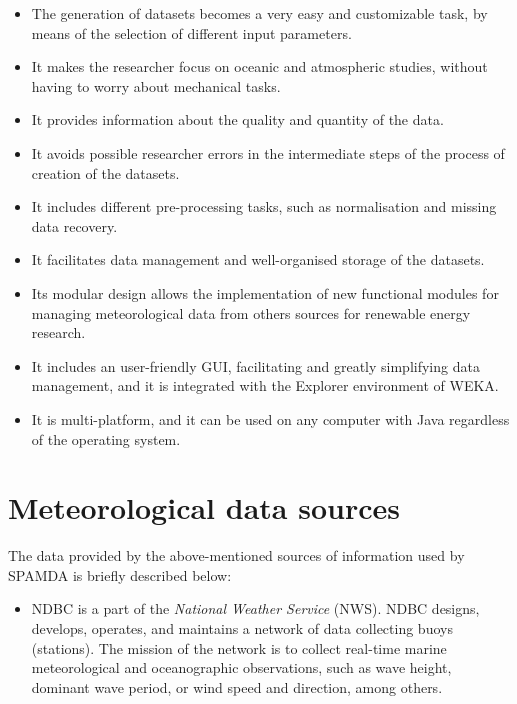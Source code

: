 \begin{onehalfspace}
				\begin{itemize}
					\item The generation of datasets becomes a very easy and customizable task, by means of the selection of different input parameters.
					\item It makes the researcher focus on oceanic and atmospheric studies, without having to worry about mechanical tasks.
					\item It provides information about the quality and quantity of the data.
					\item It avoids possible researcher errors in the intermediate steps of the process of creation of the datasets.
					\item It includes different pre-processing tasks, such as normalisation and missing data recovery.
					\item It facilitates data management and well-organised storage of the datasets.
					\item Its modular design allows the implementation of new functional modules for managing meteorological data from others sources for renewable energy research.
					\item It includes an user-friendly GUI, facilitating and greatly simplifying data management, and it is integrated with the Explorer environment of WEKA.
					\item It is multi-platform, and it can be used on any computer with Java regardless of the operating system.
				\end{itemize}
				
	\section{Meteorological data sources}\label{sec:DataSources}
		
		The data provided by the above-mentioned sources of information used by SPAMDA is briefly described below:
		
		\begin{itemize}

			\item NDBC is a part of the \textit{National Weather Service} (NWS). NDBC designs, develops, operates, and maintains a network of data collecting buoys (stations). The mission of the network is to collect real-time marine meteorological and oceanographic observations, such as wave height, dominant wave period, or wind speed and direction, among others.


\end{itemize}
\end{onehalfspace}
